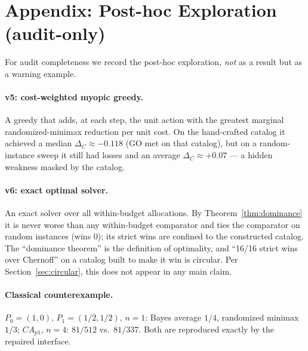 \documentclass[11pt]{article}
\begin{document}
\section{Appendix: Post-hoc Exploration (audit-only)}\label{sec:appendix}

For audit completeness we record the post-hoc exploration, \emph{not} as a result but as a warning example.

\paragraph{v5: cost-weighted myopic greedy.}
A greedy that adds, at each step, the unit action with the greatest marginal randomized-minimax reduction per unit cost. On the hand-crafted catalog it achieved a median $\Delta_C\approx-0.118$ (GO met on that catalog), but on a random-instance sweep it still had losses and an average $\Delta_C\approx+0.07$ --- a hidden weakness masked by the catalog.

\paragraph{v6: exact optimal solver.}
An exact solver over all within-budget allocations. By Theorem~\ref{thm:dominance} it is never worse than any within-budget comparator and ties the comparator on random instances (wins $0$); its strict wins are confined to the constructed catalog. The ``dominance theorem'' is the definition of optimality, and ``16/16 strict wins over Chernoff'' on a catalog built to make it win is circular. Per Section~\ref{sec:circular}, this does not appear in any main claim.

\paragraph{Classical counterexample.}
$P_0=(1,0)$, $P_1=(1/2,1/2)$, $n=1$: Bayes average $1/4$, randomized minimax $1/3$; $CA_{p1}$, $n=4$: $81/512$ vs.\ $81/337$. Both are reproduced exactly by the repaired interface.



\end{document}
